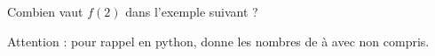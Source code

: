 
\begin{exercice}\label{exosmath-0202}

    Combien vaut \( f(2)\) dans l'exemple suivant ?



Attention : pour rappel en python,  donne les nombres de  à  avec  non compris.

\end{exercice}
